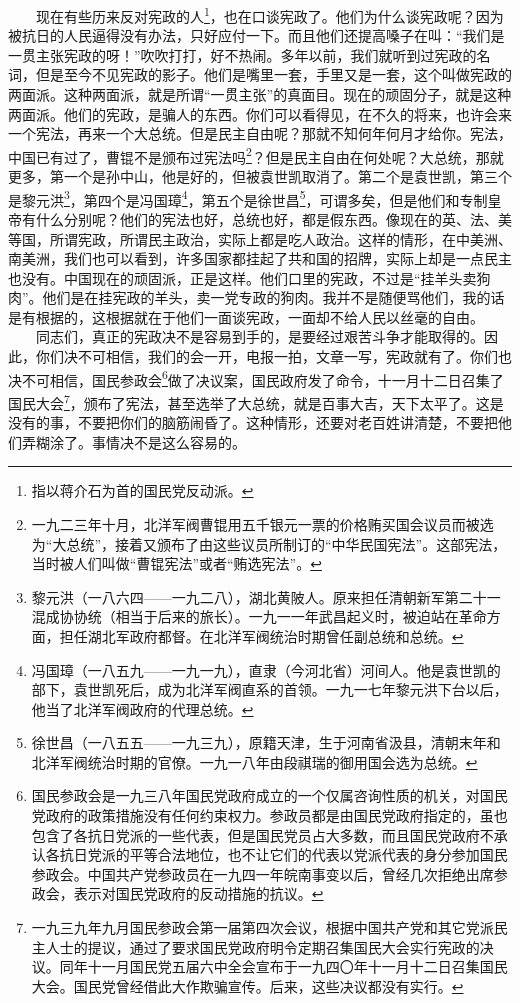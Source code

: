 \documentclass[cn,11pt,chinese]{elegantbook}
\begin{document}
　　现在有些历来反对宪政的人\footnote[2]{ 指以蒋介石为首的国民党反动派。}，也在口谈宪政了。他们为什么谈宪政呢？因为被抗日的人民逼得没有办法，只好应付一下。而且他们还提高嗓子在叫：“我们是一贯主张宪政的呀！”吹吹打打，好不热闹。多年以前，我们就听到过宪政的名词，但是至今不见宪政的影子。他们是嘴里一套，手里又是一套，这个叫做宪政的两面派。这种两面派，就是所谓“一贯主张”的真面目。现在的顽固分子，就是这种两面派。他们的宪政，是骗人的东西。你们可以看得见，在不久的将来，也许会来一个宪法，再来一个大总统。但是民主自由呢？那就不知何年何月才给你。宪法，中国已有过了，曹锟不是颁布过宪法吗\footnote[3]{ 一九二三年十月，北洋军阀曹锟用五千银元一票的价格贿买国会议员而被选为“大总统”，接着又颁布了由这些议员所制订的“中华民国宪法”。这部宪法，当时被人们叫做“曹锟宪法”或者“贿选宪法”。}？但是民主自由在何处呢？大总统，那就更多，第一个是孙中山，他是好的，但被袁世凯取消了。第二个是袁世凯，第三个是黎元洪\footnote[4]{ 黎元洪（一八六四——一九二八），湖北黄陂人。原来担任清朝新军第二十一混成协协统（相当于后来的旅长）。一九一一年武昌起义时，被迫站在革命方面，担任湖北军政府都督。在北洋军阀统治时期曾任副总统和总统。}，第四个是冯国璋\footnote[5]{ 冯国璋（一八五九——一九一九），直隶（今河北省）河间人。他是袁世凯的部下，袁世凯死后，成为北洋军阀直系的首领。一九一七年黎元洪下台以后，他当了北洋军阀政府的代理总统。}，第五个是徐世昌\footnote[6]{ 徐世昌（一八五五——一九三九），原籍天津，生于河南省汲县，清朝末年和北洋军阀统治时期的官僚。一九一八年由段祺瑞的御用国会选为总统。}，可谓多矣，但是他们和专制皇帝有什么分别呢？他们的宪法也好，总统也好，都是假东西。像现在的英、法、美等国，所谓宪政，所谓民主政治，实际上都是吃人政治。这样的情形，在中美洲、南美洲，我们也可以看到，许多国家都挂起了共和国的招牌，实际上却是一点民主也没有。中国现在的顽固派，正是这样。他们口里的宪政，不过是“挂羊头卖狗肉”。他们是在挂宪政的羊头，卖一党专政的狗肉。我并不是随便骂他们，我的话是有根据的，这根据就在于他们一面谈宪政，一面却不给人民以丝毫的自由。\\
　　同志们，真正的宪政决不是容易到手的，是要经过艰苦斗争才能取得的。因此，你们决不可相信，我们的会一开，电报一拍，文章一写，宪政就有了。你们也决不可相信，国民参政会\footnote[7]{ 国民参政会是一九三八年国民党政府成立的一个仅属咨询性质的机关，对国民党政府的政策措施没有任何约束权力。参政员都是由国民党政府指定的，虽也包含了各抗日党派的一些代表，但是国民党员占大多数，而且国民党政府不承认各抗日党派的平等合法地位，也不让它们的代表以党派代表的身分参加国民参政会。中国共产党参政员在一九四一年皖南事变以后，曾经几次拒绝出席参政会，表示对国民党政府的反动措施的抗议。}做了决议案，国民政府发了命令，十一月十二日召集了国民大会\footnote[8]{ 一九三九年九月国民参政会第一届第四次会议，根据中国共产党和其它党派民主人士的提议，通过了要求国民党政府明令定期召集国民大会实行宪政的决议。同年十一月国民党五届六中全会宣布于一九四〇年十一月十二日召集国民大会。国民党曾经借此大作欺骗宣传。后来，这些决议都没有实行。}，颁布了宪法，甚至选举了大总统，就是百事大吉，天下太平了。这是没有的事，不要把你们的脑筋闹昏了。这种情形，还要对老百姓讲清楚，不要把他们弄糊涂了。事情决不是这么容易的。\\
\end{document}

